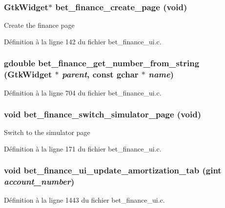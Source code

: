 \subsubsection[{bet\_\-finance\_\-create\_\-page}]{\setlength{\rightskip}{0pt plus 5cm}GtkWidget$\ast$ bet\_\-finance\_\-create\_\-page (void)}\label{bet__finance__ui_8h_a98569354482d0a913898ce67b30e1557}
Create the finance page 

Définition à la ligne 142 du fichier bet\_\-finance\_\-ui.c.

\subsubsection[{bet\_\-finance\_\-get\_\-number\_\-from\_\-string}]{\setlength{\rightskip}{0pt plus 5cm}gdouble bet\_\-finance\_\-get\_\-number\_\-from\_\-string (GtkWidget $\ast$ {\em parent}, \/  const gchar $\ast$ {\em name})}\label{bet__finance__ui_8h_a3b9902404c8eb1a244e0a57f4e9bf079}


Définition à la ligne 704 du fichier bet\_\-finance\_\-ui.c.

\subsubsection[{bet\_\-finance\_\-switch\_\-simulator\_\-page}]{\setlength{\rightskip}{0pt plus 5cm}void bet\_\-finance\_\-switch\_\-simulator\_\-page (void)}\label{bet__finance__ui_8h_acd225a5272ed6727f094bd25e7cf3cd7}
Switch to the simulator page 

Définition à la ligne 171 du fichier bet\_\-finance\_\-ui.c.

\subsubsection[{bet\_\-finance\_\-ui\_\-update\_\-amortization\_\-tab}]{\setlength{\rightskip}{0pt plus 5cm}void bet\_\-finance\_\-ui\_\-update\_\-amortization\_\-tab (gint {\em account\_\-number})}\label{bet__finance__ui_8h_ad177ea31ac56791c3a4e91ad9be07e5c}


Définition à la ligne 1443 du fichier bet\_\-finance\_\-ui.c.

